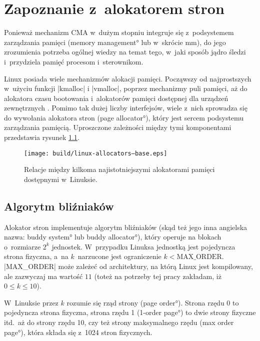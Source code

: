 \chapter{Zapoznanie z~alokatorem stron}

Ponieważ mechanizm CMA w~dużym stopniu integruje się z~podsystemem
zarządzania pamięci (\ang{memory management} lub w~skrócie mm), do
jego zrozumienia potrzeba ogólnej wiedzy na temat tego, w~jaki sposób
jądro śledzi i~przydziela pamięć procesom i~sterownikom.

Linux posiada wiele mechanizmów alokacji pamięci.  Począwszy od
najprostszych w~użyciu funkcji \code|kmalloc| i \code|vmalloc|,
poprzez mechanizmy puli pamięci, aż do alokatora czasu bootowania
i~alokatorów pamięci dostępnej dla urządzeń zewnętrznych
\autocite[rozdział 8]{bib:ldd3}.  Pomimo tak dużej liczby interfejsów,
wiele z~nich sprowadza się do wywołania alokatora stron (\ang{page
  allocator}), który jest sercem podsystemu zarządzania pamięcią.
Uproszczone zależności między tymi komponentami przedstawia rysunek
\ref{fig:allocators-base}.

\begin{figure}[h]
  \centering
  \texttt{[image: build/linux-allocators--base.eps]}
  \caption[Alokatory dostępne w~jądrze Linux.]{Relacje między kilkoma
    najistotniejszymi alokatorami pamięci dostępnymi w~Linuksie.}
  \label{fig:allocators-base}
\end{figure}

\section{Algorytm bliźniaków}

Alokator stron implementuje algorytm bliźniaków (skąd też jego inna
angielska nazwa: \ang*{buddy system} lub \ang*{buddy allocator}),
który operuje na blokach o~rozmiarze $2^k$ jednostek.  W~przypadku
Linuksa jednostką jest pojedyncza strona fizyczna, a~na $k$~narzucone
jest ograniczenie $k < \mathrm{MAX\_ORDER}$.  \code|MAX_ORDER| może
zależeć od architektury, na którą Linux jest kompilowany, ale
zazwyczaj ma wartość $11$ (toteż na potrzeby tej pracy zakładam, iż $0
\le k \le 10$).

W~Linuksie przez $k$ rozumie się rząd strony (\ang{page order}).
Strona rzędu 0 to pojedyncza strona fizyczna, strona rzędu 1
(\ang{1-order page}) to dwie strony fizyczne itd.\ aż do strony rzędu
10, czy też strony maksymalnego rzędu (\ang{max order page}), która
składa się z~1024 stron fizycznych.

